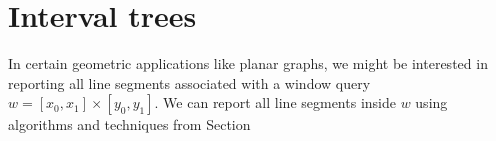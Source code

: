 \section{Interval trees}
\label{sec:interval-trees}

In certain geometric applications like planar graphs, we might be interested in reporting all line segments associated with a window query  $w = [x_0, x_1] \times [y_0, y_1]$. We can report all line segments inside $w$ using algorithms and techniques from Section
